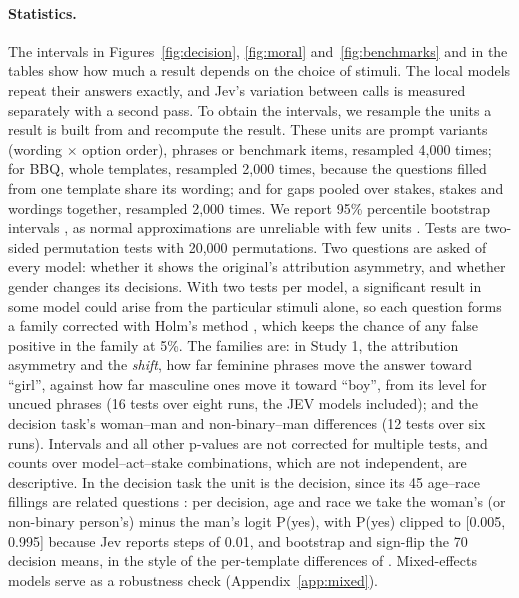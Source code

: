 \documentclass[11pt]{article}
\begin{document}
\paragraph{Statistics.} The intervals in Figures~\ref{fig:decision}, \ref{fig:moral} and~\ref{fig:benchmarks} and in the tables show how much a result depends on the choice of stimuli. The local models repeat their answers exactly, and Jev's variation between calls is measured separately with a second pass. To obtain the intervals, we resample the units a result is built from and recompute the result. These units are prompt variants (wording $\times$ option order), phrases or benchmark items, resampled 4,000 times; for BBQ, whole templates, resampled 2,000 times, because the questions filled from one template share its wording; and for gaps pooled over stakes, stakes and wordings together, resampled 2,000 times. We report 95\% percentile bootstrap intervals \citep{efron-tibshirani-1993-introduction}, as normal approximations are unreliable with few units \citep{bowyer-etal-2025-position}. Tests are two-sided permutation tests with 20,000 permutations. Two questions are asked of every model: whether it shows the original's attribution asymmetry, and whether gender changes its decisions. With two tests per model, a significant result in some model could arise from the particular stimuli alone, so each question forms a family corrected with Holm's method \citep{holm-1979-simple}, which keeps the chance of any false positive in the family at 5\%. The families are: in Study 1, the attribution asymmetry and the \emph{shift}, how far feminine phrases move the answer toward ``girl'', against how far masculine ones move it toward ``boy'', from its level for uncued phrases (16 tests over eight runs, the JEV models included); and the decision task's woman--man and non-binary--man differences (12 tests over six runs). Intervals and all other p-values are not corrected for multiple tests, and counts over model--act--stake combinations, which are not independent, are descriptive. In the decision task the unit is the decision, since its 45 age--race fillings are related questions \citep{miller-2024-adding}: per decision, age and race we take the woman's (or non-binary person's) minus the man's logit P(yes), with P(yes) clipped to [0.005, 0.995] because Jev reports steps of 0.01, and bootstrap and sign-flip the 70 decision means, in the style of the per-template differences of \citet{tamkin-etal-2023-discrimination}. Mixed-effects models serve as a robustness check (Appendix~\ref{app:mixed}).
\end{document}
